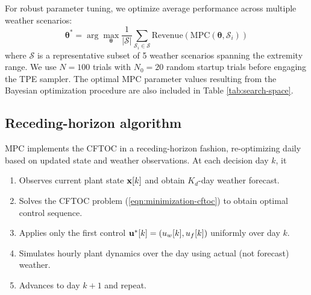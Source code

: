 \documentclass[preprint,12pt]{elsarticle}
\newcommand{\df}[2]{\displaystyle\frac{#1}{#2}}
\begin{document}
For robust parameter tuning, we optimize average performance across multiple weather scenarios:
\begin{equation}
\boldsymbol{\theta}^* = \arg\max_{\boldsymbol{\theta}} \df{1}{|\mathcal{S}|} \sum_{\mathcal{S}_i \in \mathcal{S}} \text{Revenue}(\text{MPC}(\boldsymbol{\theta}, \mathcal{S}_i))
\label{eqn:robust-objective}
\end{equation}
where $\mathcal{S}$ is a representative subset of 5 weather scenarios spanning the extremity range. We use $N = 100$ trials with $N_0 = 20$ random startup trials before engaging the TPE sampler. The optimal MPC parameter values resulting from the Bayesian optimization procedure are also included in Table \ref{tab:search-space}.

\subsection{Receding-horizon algorithm}\label{subsec:mpc-algorithm}

MPC implements the CFTOC in a receding-horizon fashion, re-optimizing daily based on updated state and weather observations. At each decision day $k$, it
\begin{enumerate}
\item Observes current plant state ${\bf x}[k]$ and obtain $K_{d}$-day weather forecast.
\item Solves the CFTOC problem (\ref{eqn:minimization-cftoc}) to obtain optimal control sequence.
\item Applies only the first control ${\bf u}^*[k] = (u_{w}[k], u_{f}[k])$ uniformly over day $k$.
\item Simulates hourly plant dynamics over the day using actual (not forecast) weather.
\item Advances to day $k+1$ and repeat.
\end{enumerate}
\end{document}
